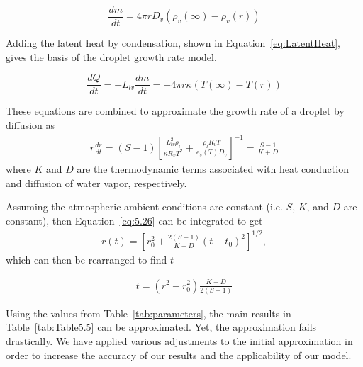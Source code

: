 \documentclass[]{article}
\begin{document}
\begin{equation}
    \label{eq:Diffusion}
    \dfrac{dm}{dt}=4 \pi r D_{v} \left( \rho_{v}(\infty) - \rho_{v}(r) \right)
\end{equation}

Adding the latent heat by condensation, shown in
Equation~\eqref{eq:LatentHeat}, gives the basis of the droplet growth rate
model.

\begin{equation}
    \label{eq:LatentHeat}
    \dfrac{dQ}{dt}=-L_{lv}\dfrac{dm}{dt}=-4 \pi r \kappa \left( T(\infty) - T(r) \right)
\end{equation}

These equations are combined to approximate the growth rate of a droplet by
diffusion as
\begin{align}
    \label{eq:5.26}
    r \frac{dr}{dt} = (S - 1) \left[ \frac{L_{lv}^2 \rho_l}{\kappa R_v T^2} + \frac{\rho_l R_v T}{e_s(T) D_v} \right] ^{-1} = \frac{S - 1}{K + D}
\end{align}
where $K$ and $D$ are the thermodynamic terms associated with heat conduction
and diffusion of water vapor, respectively.

Assuming the atmospheric ambient conditions are constant (i.e. $S$, $K$, and
$D$ are constant), then Equation~\ref{eq:5.26} can be integrated to get
\begin{align}
    \label{eq:5.27}
    r(t) = \left[ r_0^2 + \frac{2(S -1)}{K + D}(t - t_0)^2 \right] ^{1/2},
\end{align}
which can then be rearranged to find $t$

\begin{align}
    \label{eq:5.27T}
    t = (r^2 - r_0^2) \frac{K + D}{2(S - 1)}
\end{align}

Using the values from Table~\ref{tab:parameters}, the main results in
Table~\ref{tab:Table5.5} can be approximated. Yet, the approximation fails
drastically. We have applied various adjustments to the initial approximation
in order to increase the accuracy of our results and the applicability of our
model.
\end{document}
